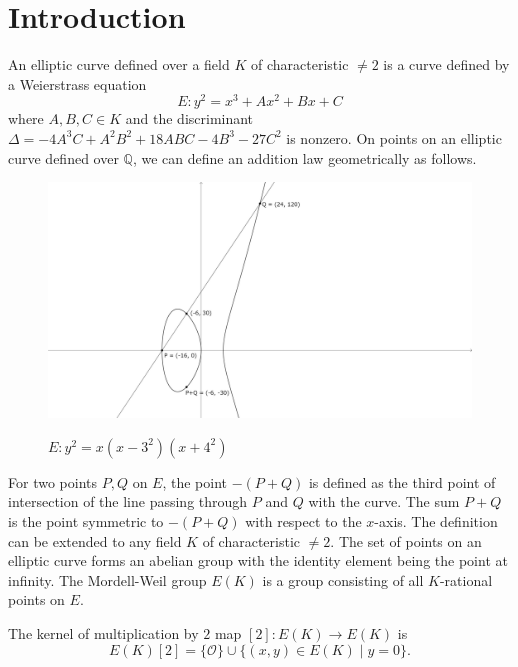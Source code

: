 \documentclass[main]{subfiles}
\begin{document}
\section{Introduction}

An elliptic curve defined over a field $K$ of characteristic $\neq 2$ is a curve defined by a Weierstrass equation
\begin{equation*}
    E: y^{2} = x^{3} + Ax^2 + Bx + C
\end{equation*}
where $A,B,C \in K$ and the discriminant $\Delta = -4A^3C + A^2B^2 + 18ABC - 4B^3 - 27C^2$ is nonzero.
On points on an elliptic curve defined over $\mathbb{Q}$, we can define an addition law geometrically as follows.
\begin{figure}[H]
    \centering
    \caption{$E: y^2 = x(x-3^2)(x+4^2)$}
    \includegraphics[keepaspectratio, width=\linewidth]{figures/3-4-5.png}
    \label{fig:elliptic_curve}
\end{figure}
For two points $P,Q$ on $E$, the point $-(P+Q)$ is defined as the third point of intersection of the line passing through $P$ and $Q$ with the curve.
The sum $P+Q$ is the point symmetric to $-(P+Q)$ with respect to the $x$-axis.
The definition can be extended to any field $K$ of characteristic $\neq 2$.
The set of points on an elliptic curve forms an abelian group with the identity element being the point at infinity.
The Mordell-Weil group $E(K)$ is a group consisting of all $K$-rational points on $E$.

\begin{prop}
    The kernel of multiplication by $2$ map $[2]: E(K) \to E(K)$ is
    \begin{equation*}
        E(K)[2] = \{ \mathcal{O} \} \cup \{ (x,y) \in E(K) \mid y = 0 \}.
    \end{equation*}
\end{prop}
\end{document}
